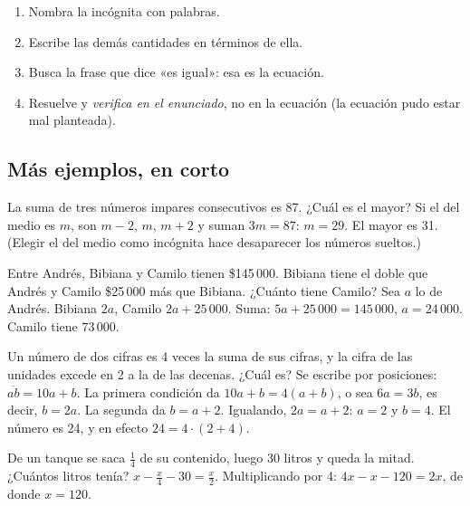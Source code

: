 \begin{regla}
\begin{enumerate}
  \item Nombra la incógnita con palabras.
  \item Escribe las demás cantidades en términos de ella.
  \item Busca la frase que dice «es igual»: esa es la ecuación.
  \item Resuelve y \emph{verifica en el enunciado}, no en la ecuación (la ecuación pudo estar mal planteada).
\end{enumerate}
\end{regla}

\subsection{Más ejemplos, en corto}
\begin{ejemplo}[Consecutivos]
La suma de tres números impares consecutivos es 87. ¿Cuál es el mayor?
\solucion Si el del medio es $m$, son $m - 2$, $m$, $m + 2$ y suman $3m = 87$: $m = 29$. El mayor es 31. (Elegir el del
medio como incógnita hace desaparecer los números sueltos.)
\end{ejemplo}

\begin{ejemplo}
Entre Andrés, Bibiana y Camilo tienen \$145\,000. Bibiana tiene el doble que Andrés y Camilo \$25\,000 más que Bibiana.
¿Cuánto tiene Camilo?
\solucion Sea $a$ lo de Andrés. Bibiana $2a$, Camilo $2a + 25\,000$. Suma: $5a + 25\,000 = 145\,000$, $a = 24\,000$.
Camilo tiene $73\,000$.
\end{ejemplo}

\begin{ejemplo}
Un número de dos cifras es 4 veces la suma de sus cifras, y la cifra de las unidades excede en 2 a la de las decenas.
¿Cuál es?
\solucion Se escribe por posiciones: $\overline{ab} = 10a + b$. La primera condición da $10a + b = 4(a + b)$, o sea
$6a = 3b$, es decir, $b = 2a$. La segunda da $b = a + 2$. Igualando, $2a = a + 2$: $a = 2$ y $b = 4$. El número es 24,
y en efecto $24 = 4 \cdot (2 + 4)$.
\end{ejemplo}

\begin{ejemplo}
De un tanque se saca $\tfrac14$ de su contenido, luego 30 litros y queda la mitad. ¿Cuántos litros tenía?
\solucion $x - \tfrac{x}{4} - 30 = \tfrac{x}{2}$. Multiplicando por 4: $4x - x - 120 = 2x$, de donde $x = 120$.
\end{ejemplo}

